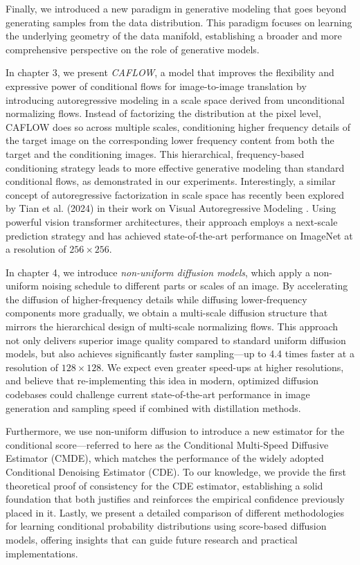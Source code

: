 Finally, we introduced a new paradigm in generative modeling that goes beyond generating samples from the data distribution. This paradigm focuses on learning the underlying geometry of the data manifold, establishing a broader and more comprehensive perspective on the role of generative models.

In chapter 3, we present \emph{CAFLOW}, a model that improves the flexibility and expressive power of conditional flows for image-to-image translation by introducing autoregressive modeling in a scale space derived from unconditional normalizing flows. Instead of factorizing the distribution at the pixel level, CAFLOW does so across multiple scales, conditioning higher frequency details of the target image on the corresponding lower frequency content from both the target and the conditioning images. This hierarchical, frequency-based conditioning strategy leads to more effective generative modeling than standard conditional flows, as demonstrated in our experiments. Interestingly, a similar concept of autoregressive factorization in scale space has recently been explored by Tian et al. (2024) in their work on Visual Autoregressive Modeling \cite{tian2024visual}. Using powerful vision transformer architectures, their approach employs a next-scale prediction strategy and has achieved state-of-the-art performance on ImageNet at a resolution of $256\times256$.

In chapter 4, we introduce \emph{non-uniform diffusion models}, which apply a non-uniform noising schedule to different parts or scales of an image. By accelerating the diffusion of higher-frequency details while diffusing lower-frequency components more gradually, we obtain a multi-scale diffusion structure that mirrors the hierarchical design of multi-scale normalizing flows. This approach not only delivers superior image quality compared to standard uniform diffusion models, but also achieves significantly faster sampling—up to 4.4 times faster at a resolution of $128\times128$. We expect even greater speed-ups at higher resolutions, and believe that re-implementing this idea in modern, optimized diffusion codebases could challenge current state-of-the-art performance in image generation and sampling speed if combined with distillation methods.

Furthermore, we use non-uniform diffusion to introduce a new estimator for the conditional score—referred to here as the Conditional Multi-Speed Diffusive Estimator (CMDE), which matches the performance of the widely adopted Conditional Denoising Estimator (CDE). To our knowledge, we provide the first theoretical proof of consistency for the CDE estimator, establishing a solid foundation that both justifies and reinforces the empirical confidence previously placed in it. Lastly, we present a detailed comparison of different methodologies for learning conditional probability distributions using score-based diffusion models, offering insights that can guide future research and practical implementations.

